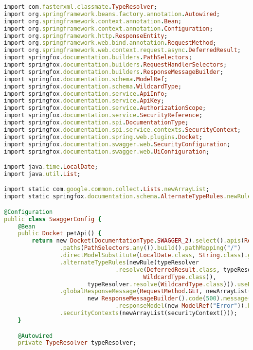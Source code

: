 \begin{lstlisting}[language=Ruby, style=rubystyle]
import com.fasterxml.classmate.TypeResolver;
import org.springframework.beans.factory.annotation.Autowired;
import org.springframework.context.annotation.Bean;
import org.springframework.context.annotation.Configuration;
import org.springframework.http.ResponseEntity;
import org.springframework.web.bind.annotation.RequestMethod;
import org.springframework.web.context.request.async.DeferredResult;
import springfox.documentation.builders.PathSelectors;
import springfox.documentation.builders.RequestHandlerSelectors;
import springfox.documentation.builders.ResponseMessageBuilder;
import springfox.documentation.schema.ModelRef;
import springfox.documentation.schema.WildcardType;
import springfox.documentation.service.ApiInfo;
import springfox.documentation.service.ApiKey;
import springfox.documentation.service.AuthorizationScope;
import springfox.documentation.service.SecurityReference;
import springfox.documentation.spi.DocumentationType;
import springfox.documentation.spi.service.contexts.SecurityContext;
import springfox.documentation.spring.web.plugins.Docket;
import springfox.documentation.swagger.web.SecurityConfiguration;
import springfox.documentation.swagger.web.UiConfiguration;

import java.time.LocalDate;
import java.util.List;

import static com.google.common.collect.Lists.newArrayList;
import static springfox.documentation.schema.AlternateTypeRules.newRule;

@Configuration
public class SwaggerConfig {
    @Bean
    public Docket petApi() {
        return new Docket(DocumentationType.SWAGGER_2).select().apis(RequestHandlerSelectors.any())
                .paths(PathSelectors.any()).build().pathMapping("/")
                .directModelSubstitute(LocalDate.class, String.class).genericModelSubstitutes(ResponseEntity.class)
                .alternateTypeRules(newRule(typeResolver
                                .resolve(DeferredResult.class, typeResolver.resolve(ResponseEntity.class,
                                        WildcardType.class)),
                        typeResolver.resolve(WildcardType.class))).useDefaultResponseMessages(false)
                .globalResponseMessage(RequestMethod.GET, newArrayList(
                        new ResponseMessageBuilder().code(500).message("500 message")
                                .responseModel(new ModelRef("Error")).build())).securitySchemes(newArrayList(apiKey()))
                .securityContexts(newArrayList(securityContext()));
    }

    @Autowired
    private TypeResolver typeResolver;


\end{lstlisting}
